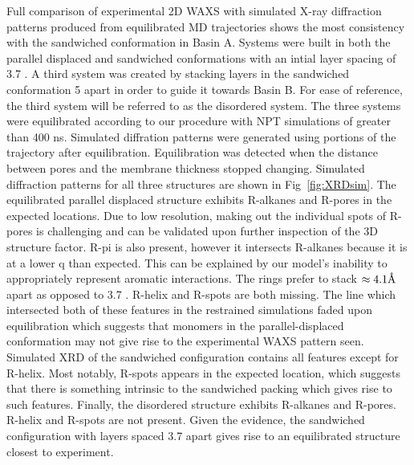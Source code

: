 Full comparison of experimental 2D WAXS with simulated X-ray diffraction
patterns produced from equilibrated MD trajectories shows the most consistency
with the sandwiched conformation in Basin A. Systems were built in both the 
parallel displaced and sandwiched conformations with an intial layer spacing of
3.7 \angstrom. A third system was created by stacking layers in the sandwiched 
conformation 5 \angstrom apart in order to guide it towards Basin B. For ease of
reference, the third system will be referred to as the disordered system. The 
three systems were equilibrated according to our procedure with NPT simulations of 
greater than 400 ns. Simulated diffration patterns were generated using 
portions of the trajectory after equilibration. Equilibration was detected
when the distance between pores and the membrane thickness stopped changing.
Simulated diffraction patterns for all three structures are shown in 
Fig~\ref{fig:XRDsim}. The equilibrated parallel displaced structure exhibits 
R-alkanes and R-pores in the expected locations. Due to low resolution, making
out the individual spots of R-pores is challenging and can be validated upon
further inspection of the 3D structure factor. R-pi is also present, however it
intersects R-alkanes because it is at a lower q than expected. This can be 
explained by our model's inability to appropriately represent aromatic interactions.
The rings prefer to stack $\approx 4.1 \textup{\AA}$ apart as opposed to 3.7 \angstrom.
R-helix and R-spots are both missing. The line which intersected both of these
features in the restrained simulations faded upon equilibration which suggests
that monomers in the parallel-displaced conformation may not give rise to the 
experimental WAXS pattern seen. Simulated XRD of the sandwiched configuration 
contains all features except for R-helix. Most notably, R-spots appears in the
expected location, which suggests that there is something intrinsic to
the sandwiched packing which gives rise to such features. Finally, the 
disordered structure exhibits R-alkanes and R-pores. R-helix and R-spots are not
present. Given the evidence, the sandwiched configuration with layers spaced
3.7 \angstrom apart gives rise to an equilibrated structure closest to experiment. 

